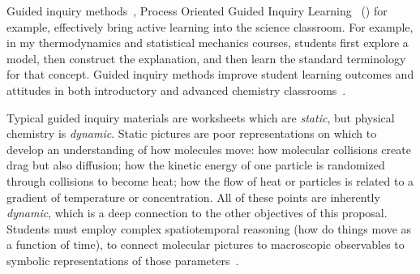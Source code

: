 \documentclass[10pt,letterpaper]{article}
\begin{document}
%



%
%
Guided inquiry methods~\cite{farrellJCE-99,lewisJCE-05,minderhoutBMBE-07,moog-08,eberleinBMBE-08}, Process Oriented Guided Inquiry Learning~\cite{moog-08} (\pogil) for example, effectively bring active learning into the science classroom. For example, in my thermodynamics and statistical mechanics courses, students first explore a model, then construct the explanation, and then learn the standard terminology for that concept. Guided inquiry methods improve student learning outcomes and attitudes in both introductory and advanced chemistry classrooms~\cite{lewisJCE-05}. 


Typical guided inquiry materials are worksheets which are \textit{static}, but physical chemistry is \textit{dynamic}. 
Static pictures are poor representations on which to develop an understanding of how molecules move: how molecular collisions create drag but also diffusion; how the kinetic energy of one particle is randomized through collisions to become heat;
how the flow of heat or particles is related to a gradient of temperature or concentration. All of these points are inherently \textit{dynamic}, which is a deep connection to the other objectives of this proposal. Students must employ complex spatiotemporal reasoning (how do things move as a function of time), to connect molecular pictures to macroscopic observables to symbolic representations of those parameters~\cite{burkeJCE-98,marsonJCE-11}. 
\end{document}
